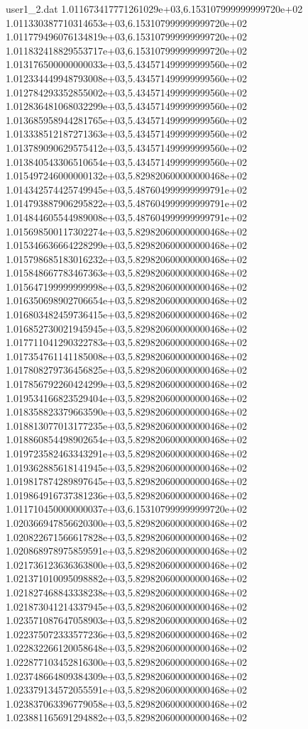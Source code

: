 \begin{filecontents}{user1_2.dat}
1.011673417771261029e+03,6.153107999999999720e+02
1.011330387710314653e+03,6.153107999999999720e+02
1.011779496076134819e+03,6.153107999999999720e+02
1.011832418829553717e+03,6.153107999999999720e+02
1.013176500000000033e+03,5.434571499999999560e+02
1.012334449948793008e+03,5.434571499999999560e+02
1.012784293352855002e+03,5.434571499999999560e+02
1.012836481068032299e+03,5.434571499999999560e+02
1.013685958944281765e+03,5.434571499999999560e+02
1.013338512187271363e+03,5.434571499999999560e+02
1.013789090629575412e+03,5.434571499999999560e+02
1.013840543306510654e+03,5.434571499999999560e+02
1.015497246000000132e+03,5.829820600000000468e+02
1.014342574425749945e+03,5.487604999999999791e+02
1.014793887906295822e+03,5.487604999999999791e+02
1.014844605544989008e+03,5.487604999999999791e+02
1.015698500117302274e+03,5.829820600000000468e+02
1.015346636664228299e+03,5.829820600000000468e+02
1.015798685183016232e+03,5.829820600000000468e+02
1.015848667783467363e+03,5.829820600000000468e+02
1.015647199999999998e+03,5.829820600000000468e+02
1.016350698902706654e+03,5.829820600000000468e+02
1.016803482459736415e+03,5.829820600000000468e+02
1.016852730021945945e+03,5.829820600000000468e+02
1.017711041290322783e+03,5.829820600000000468e+02
1.017354761141185008e+03,5.829820600000000468e+02
1.017808279736456825e+03,5.829820600000000468e+02
1.017856792260424299e+03,5.829820600000000468e+02
1.019534166823529404e+03,5.829820600000000468e+02
1.018358823379663590e+03,5.829820600000000468e+02
1.018813077013177235e+03,5.829820600000000468e+02
1.018860854498902654e+03,5.829820600000000468e+02
1.019723582463343291e+03,5.829820600000000468e+02
1.019362885618141945e+03,5.829820600000000468e+02
1.019817874289897645e+03,5.829820600000000468e+02
1.019864916737381236e+03,5.829820600000000468e+02
1.011710450000000037e+03,6.153107999999999720e+02
1.020366947856620300e+03,5.829820600000000468e+02
1.020822671566617828e+03,5.829820600000000468e+02
1.020868978975859591e+03,5.829820600000000468e+02
1.021736123636363800e+03,5.829820600000000468e+02
1.021371010095098882e+03,5.829820600000000468e+02
1.021827468843338238e+03,5.829820600000000468e+02
1.021873041214337945e+03,5.829820600000000468e+02
1.023571087647058903e+03,5.829820600000000468e+02
1.022375072333577236e+03,5.829820600000000468e+02
1.022832266120058648e+03,5.829820600000000468e+02
1.022877103452816300e+03,5.829820600000000468e+02
1.023748664809384309e+03,5.829820600000000468e+02
1.023379134572055591e+03,5.829820600000000468e+02
1.023837063396779058e+03,5.829820600000000468e+02
1.023881165691294882e+03,5.829820600000000468e+02

\end{filecontents}

